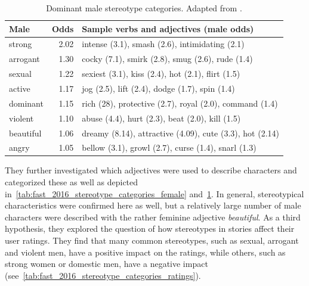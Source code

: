 \begin{table}[ht]
    \centering
    \begin{tabular}{lrl}
        \toprule
        \textbf{Male} & \textbf{Odds} & \textbf{Sample verbs and adjectives (male odds)}         \\
        \midrule
        strong        & 2.02          & intense (3.1), smash (2.6), intimidating (2.1)           \\
        arrogant      & 1.30          & cocky (7.1), smirk (2.8), smug (2.6), rude (1.4)         \\
        sexual        & 1.22          & sexiest (3.1), kiss (2.4), hot (2.1), flirt (1.5)        \\
        active        & 1.17          & jog (2.5), lift (2.4), dodge (1.7), spin (1.4)           \\
        dominant      & 1.15          & rich (28), protective (2.7), royal (2.0), command (1.4)  \\
        violent       & 1.10          & abuse (4.4), hurt (2.3), beat (2.0), kill (1.5)          \\
        beautiful     & 1.06          & dreamy (8.14), attractive (4.09), cute (3.3), hot (2.14) \\
        angry         & 1.05          & bellow (3.1), growl (2.7), curse (1.4), snarl (1.3)      \\
        \bottomrule
    \end{tabular}
    \caption[Dominant male stereotype categories.]{Dominant male stereotype categories. Adapted from \citet[Table~2]{Fast2016ShirtlessCommunity}.}
    \label{tab:fast_2016_stereotype_categories_male}
\end{table}

They further investigated which adjectives were used to describe characters and categorized these as well as depicted in~\ref{tab:fast_2016_stereotype_categories_female} and~\ref{tab:fast_2016_stereotype_categories_male}.
In general, stereotypical characteristics were confirmed here as well, but a relatively large number of male characters were described with the rather feminine adjective \emph{beautiful}.
As a third hypothesis, they explored the question of how stereotypes in stories affect their user ratings.
They find that many common stereotypes, such as sexual, arrogant and violent men, have a positive impact on the ratings, while others, such as strong women or domestic men, have a negative impact (see~\ref{tab:fast_2016_stereotype_categories_ratings}).

